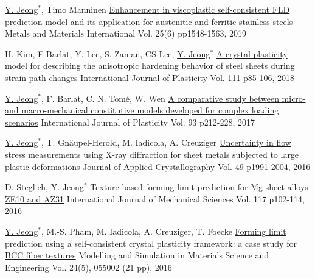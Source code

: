 \begin{cventries}
  \cventry
  {\underline{Y. Jeong}$^*$, Timo Manninen}
  {\href{https://doi.org/10.1007/s12540-019-00292-5}{Enhancement in viscoplastic self-consistent FLD prediction model and its application for austenitic and ferritic stainless steels}}
  {Metals and Materials International}
  {Vol. 25(6) pp1548-1563, 2019}
  {
  }

  \cventry
  {H. Kim, F Barlat, Y. Lee, S. Zaman, CS Lee, \underline{Y. Jeong}$^*$}
  {\href{https://doi.org/10.1016/j.ijplas.2018.07.010}{A crystal plasticity model for describing the anisotropic hardening behavior of steel sheets during strain-path changes}}
  {International Journal of Plasticity}
  {Vol. 111 p85-106, 2018}
  {
  }

  \cventry
  {\underline{Y. Jeong}$^*$, F. Barlat, C. N. Tom\'{e}, W. Wen}
  {\href{http://dx.doi.org/10.1016/j.ijplas.2016.07.015}{A comparative study between micro- and macro-mechanical constitutive models developed for complex loading scenarios}}
  {International Journal of Plasticity}
  {Vol. 93 p212-228, 2017} %
  {
  }

  \cventry
  {\underline{Y. Jeong}$^*$, T. Gn\"{a}upel-Herold, M. Iadicola, A. Creuziger} %
  {\href{https://doi.org/10.1107/S1600576716013662}{Uncertainty in flow stress measurements using X-ray diffraction for sheet metals subjected to large plastic deformations}} %
  {Journal of Applied Crystallography} %
  {Vol. 49 p1991-2004, 2016} %
  {
  }

  \cventry
  {D. Steglich, \underline{Y. Jeong}$^*$}
  {\href{http://dx.doi.org/10.1016/j.ijmecsci.2016.08.013}{Texture-based forming limit prediction for Mg sheet alloys ZE10 and AZ31}}
  {International Journal of Mechanical Sciences} %
  {Vol. 117 p102-114, 2016} %
  {
  }

  \cventry
  {\underline{Y. Jeong}$^*$, M.-S. Pham, M. Iadicola, A. Creuziger, T. Foecke}
  {\href{http://dx.doi.org/10.1088/0965-0393/24/5/055005}{Forming limit prediction using a self-consistent crystal plasticity framework: a case study for BCC fiber textures}}
  {Modelling and Simulation in Materials Science and Engineering}
  {Vol. 24(5), 055002 (21 pp), 2016} %
  {
  }


\end{cventries}
